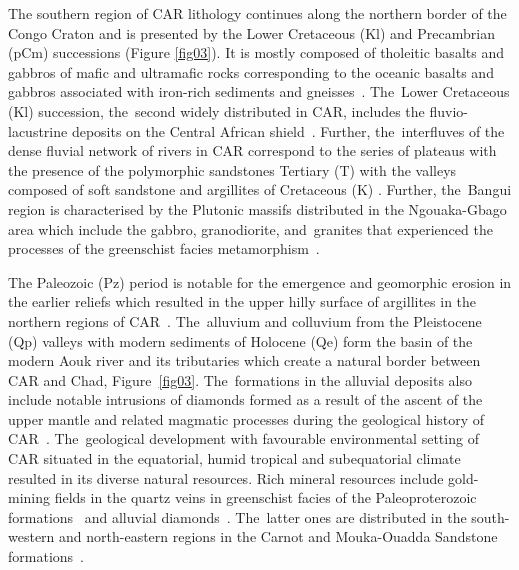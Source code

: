 \documentclass[minerals,article,accept,pdftex,moreauthors]{Definitions/mdpi}
\begin{document}
The southern region of CAR lithology continues along %
the northern border of the Congo Craton and is presented by the Lower Cretaceous (Kl) and Precambrian (pCm) successions (Figure \ref{fig03}). It is mostly composed of tholeitic basalts and gabbros of mafic and ultramafic rocks corresponding to the oceanic basalts and gabbros associated with iron-rich sediments and gneisses~\cite{TOPIEN2023104793}. The~Lower Cretaceous (Kl) succession, the~second widely distributed in CAR, includes the fluvio-lacustrine deposits on the Central African shield~\cite{Boulvert1983}. Further, the~interfluves of the dense fluvial network of rivers in CAR correspond to the series of plateaus with the presence of the polymorphic sandstones Tertiary (T) with the valleys composed of soft sandstone and argillites of Cretaceous (K) \cite{Mestraudetal1964}. Further, the~Bangui region is characterised by the Plutonic massifs distributed in the Ngouaka-Gbago area which include the gabbro, granodiorite, and~granites that experienced the processes of the greenschist facies metamorphism~\cite{VONTO2020103831}.

The Paleozoic (Pz) period is notable for the emergence and geomorphic erosion in the earlier reliefs which resulted in the upper hilly surface of argillites in the northern regions of CAR~\cite{Boulvert1995}. The~alluvium and colluvium from the Pleistocene (Qp) valleys with modern sediments of Holocene (Qe) {form the basin} of the modern Aouk river and its tributaries which create a natural border between CAR and Chad, Figure~\ref{fig03}. The~formations in the alluvial deposits also include notable intrusions of diamonds formed as a result of the ascent of the upper mantle and related magmatic processes during the geological history of CAR~\cite{Censieretal1998,Censier,MALPELI2014249,berthoumieux1957mission}. The~geological development with favourable environmental setting of CAR situated in the equatorial, humid tropical and subequatorial climate resulted in its diverse natural resources. Rich mineral resources include gold-mining fields in the quartz veins in greenschist facies of the Paleoproterozoic formations~\cite{KPEOU2020103825} and alluvial diamonds~\cite{USGSreportFR2013}. The~latter ones are distributed in the south-western and north-eastern regions in the Carnot and Mouka-Ouadda Sandstone formations~\cite{MALPELI2014249,USGSreport}. 
\end{document}
